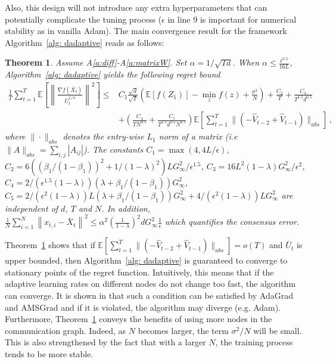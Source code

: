\documentclass{article} %
\newtheorem{theorem}{Theorem}
\begin{document}
Also, this design will not introduce any extra hyperparameters that can potentially complicate the tuning process ($\epsilon$ in line 9 is important for numerical stability as in vanilla Adam).  
The main convergence result for the framework Algorithm~\ref{alg: dadaptive} reads as follows:
\begin{theorem}\label{thm: dagm_converge}
Assume A\ref{a:diff}-A\ref{a:matrixW}.
Set $\alpha = 1/
	\sqrt{Td}$. When $\alpha  \leq \frac{\epsilon^{0.5}}{16L} $, 
	  Algorithm~\ref{alg: dadaptive} yields the following regret bound
	{\small 
	\begin{align}\label{eq: thm1}
	 \frac{1}{T}\sum_{t=1}^T  \mathbb E \left [\left\|\frac{\nabla f( \overline X_{t})}{\overline U_{t}^{1/4}}\right\|^2  \right] 
	\leq  & C_1 \frac{\sqrt{d}}{\sqrt{T}} \left(\mathbb E  [f( Z_{1})]  - \min_{z} f(z)  + \frac{\sigma^2}{N}\right)  +  \frac{ C_2 }{T}    + \frac{C_3}{T^{1.5}d^{0.5}}  \nonumber \\ 
	&+ \left(  \frac{C_4}{T N^{0.5} }  + \frac{C_5}{T^{1.5}d^{0.5} N^{0.5}}   \right) \mathbb E \left[ \sum_{t=1}^{T}   \|    (- \hat V_{t-2} + \hat V_{t-1} ) \|_{abs} \right]  \, ,
	\end{align}
	}
where $\| \cdot\|_{abs}$  denotes the entry-wise $L_1$ norm of a matrix (i.e $\| A\|_{abs} = \sum_{i,j}{|A_{ij}|}$). The constants $C_1 =  \max (4, 4{L/\epsilon})$,
	$C_2 =  6 (( \beta_1/(1-\beta_1))^2 + 1/(1-\lambda)^2 )L  G_{\infty}^2 /\epsilon^{1.5}$,
	$C_3 =  16L^2  (1-\lambda) G_{\infty}^2/\epsilon^2$,
	$C_4 =   2/ (\epsilon^{1.5}(1-\lambda)) (     \lambda + \beta_1/(1-\beta_1)) G_{\infty}^2$,
	$C_5 =   2/ (\epsilon^{2}(1-\lambda))   L  (\lambda + \beta_1/(1-\beta_1)) G_{\infty}^2  + 4/ (\epsilon^{2}(1-\lambda))   L    G_{\infty}^2$ are independent of $d$, $T$ and $N$. In addition, $\frac{1}{N}\sum_{i=1}^N\left\| {  x_{t,i} -   \overline X_{t}}  \right\|^2   \leq \alpha^2 \left (\frac{1}{1-\lambda} \right)^2 d G_{\infty}^2 \frac{1}{\epsilon}$ which quantifies the consensus error.
\end{theorem}
Theorem~\ref{thm: dagm_converge} shows that if $\mathbb E [ \sum_{t=1}^{T} \|(- \hat V_{t-2} + \hat V_{t-1} ) \|_{abs} ]  = o(T)$ and $\bar U_t$ is upper bounded, then Algorithm~\ref{alg: dadaptive} is guaranteed to converge to stationary points of the regret function. 
Intuitively, this means that if the adaptive learning rates on different nodes do not change too fast, the algorithm can converge. It is shown in \citet{chen2018convergence} that such a condition can be satisfied by AdaGrad and AMSGrad and if it is violated, the algorithm may diverge (e.g. Adam). 
Furthermore, Theorem~\ref{thm: dagm_converge} conveys the benefits of using more nodes in the communication graph. 
Indeed, as $N$ becomes larger, the term $\sigma^2/N$ will be small. 
This is also strengthened by the fact that with a larger $N$, the training process tends to be more stable. 
\end{document}
